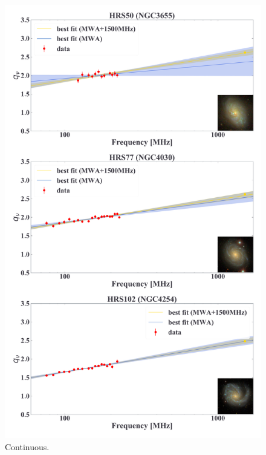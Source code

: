 \documentclass[12pt,a4paper,twoside,openright,final,titlepage]{report}
\begin{document}
\begin{appendices}
\begin{figure}[htbp]
    \centering
    \includegraphics[width=.8\linewidth]{Figures/AppendixC_qfitting2.pdf}
    \caption[Fitting results for 18 samples (2)]{\label{fig:fittingresults2}
        Continuous.
    }
\end{figure}


\end{appendices}
\end{document}
